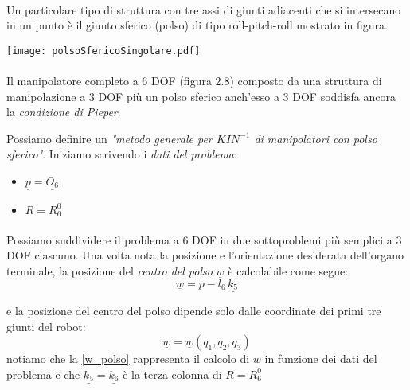 \paragraph{}
Un particolare tipo di struttura con tre assi di giunti adiacenti che si intersecano in un punto è il giunto sferico (polso) di tipo roll-pitch-roll mostrato in figura.

\begin{center}
\texttt{[image: polsoSfericoSingolare.pdf]}
\end{center}

\paragraph{}
Il manipolatore completo a 6 DOF (figura $2.8$) composto da una struttura di manipolazione a 3 DOF più un polso sferico anch'esso a 3 DOF soddisfa ancora la \emph{condizione di Pieper}. 

Possiamo definire un \emph{"metodo generale per $KIN^{-1}$ di manipolatori con polso sferico"}. Iniziamo scrivendo i \emph{dati del problema}:
\begin{itemize}
	\item $\underline{p} = \underline{O_6}$ 
	\item $R = R_6^0$
\end{itemize}

\paragraph{}
Possiamo suddividere il problema a 6 DOF in due sottoproblemi più semplici a 3 DOF ciascuno. Una volta nota la posizione e l'orientazione desiderata dell'organo terminale, la posizione del \emph{centro del polso} $\underline{w}$ è calcolabile come segue:
\begin{equation} \label{w_polso}
	\underline{w} = \underline{p} - l_6\,\underline{k_5}
\end{equation}

e la posizione del centro del polso dipende solo dalle coordinate dei primi tre giunti del robot:
\begin{equation} \label{funzione_w}
	\underline{w} = \underline{w}(q_1, q_2, q_3)
\end{equation}
notiamo che la \eqref{w_polso} rappresenta il calcolo di $\underline{w}$ in funzione dei dati del problema e che $\underline{k_5} = \underline{k_6}$ è la terza colonna di $R = R_6^0$

